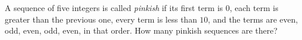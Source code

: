 A sequence of five integers is called \emph{pinkish} if its first term is $0$, each term is greater than the previous one, every term is less than $10$, and the terms are even, odd, even, odd, even, in that order. How many pinkish sequences are there?
